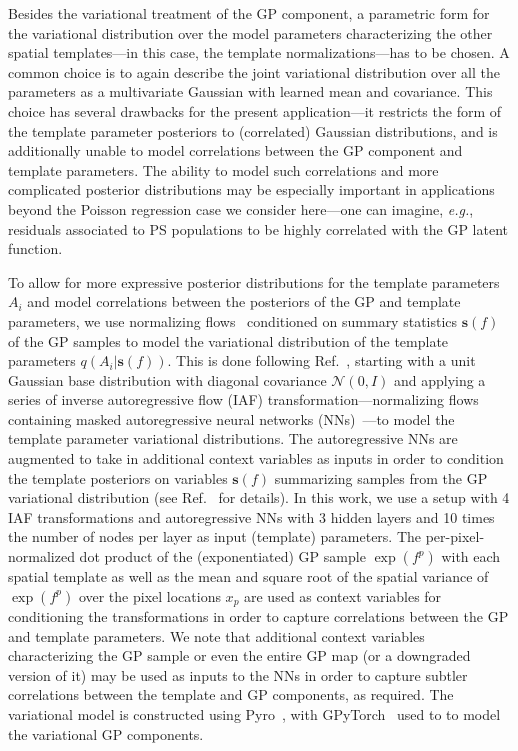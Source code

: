 \documentclass[]{article}
\begin{document}
Besides the variational treatment of the GP component, a parametric form for the variational distribution over the model parameters characterizing the other spatial templates---in this case, the template normalizations---has to be chosen. A common choice is to again describe the joint variational distribution over all the parameters as a multivariate Gaussian with learned mean and covariance. This choice has several drawbacks for the present application---it restricts the form of the template parameter posteriors to (correlated) Gaussian distributions, and is additionally unable to model correlations between the GP component and template parameters. The ability to model such correlations and more complicated posterior distributions may be especially important in applications beyond the Poisson regression case we consider here---one can imagine, \emph{e.g.}, residuals associated to PS populations to be highly correlated with the GP latent function.

To allow for more expressive posterior distributions for the template parameters $A_i$ and model correlations between the posteriors of the GP and template parameters, we use normalizing flows~\cite{pmlr-v37-rezende15} conditioned on summary statistics $\mathbf{s}(f)$ of the GP samples to model the variational distribution of the template parameters $q(A_i|\mathbf{s}(f))$.
This is done following Ref.~\cite{quinonero-candela_unifying_2005}, starting with a unit Gaussian base distribution with diagonal covariance $\mathcal{N}(0, I)$ and applying a series of inverse autoregressive flow (IAF) transformation---normalizing flows containing masked autoregressive neural networks (NNs)~\cite{germain2015made}---to model the template parameter variational distributions. The autoregressive NNs are augmented to take in additional context variables as inputs in order to condition the template posteriors on variables $\mathbf{s}(f)$ summarizing samples from the GP variational distribution (see Ref.~\cite{10.5555/3045390.3045710} for details). In this work, we use a setup with 4 IAF transformations and autoregressive NNs with 3 hidden layers and 10 times the number of nodes per layer as input (template) parameters. The per-pixel-normalized dot product of the (exponentiated) GP sample $\exp\left(f^p\right)$ with each spatial template as well as the mean and square root of the spatial variance of $\exp\left(f^p\right)$ over the pixel locations $x_p$ are used as context variables for conditioning the transformations in order to capture correlations between the GP and template parameters. We note that additional context variables characterizing the GP sample or even the entire GP map (or a downgraded version of it) may be used as inputs to the NNs in order to capture subtler correlations between the template and GP components, as required. The variational model is constructed using Pyro~\cite{bingham2019pyro}, with GPyTorch~\cite{gardner2018gpytorch} used to to model the variational GP components. 
\end{document}
